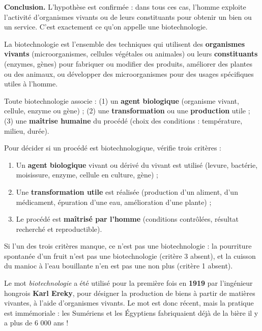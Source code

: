 \documentclass[11pt]{article}
\newcommand{\cle}[1]{{\popxbold\color{popdark}#1}}
\begin{document}
\textbf{Conclusion.} L'hypothèse est confirmée : dans tous ces cas, l'homme exploite l'activité d'organismes vivants ou de leurs constituants pour obtenir un bien ou un service. C'est exactement ce qu'on appelle une biotechnologie.

\begin{definition}[Biotechnologie]
La \cle{biotechnologie} est l'ensemble des techniques qui utilisent des \textbf{organismes vivants} (microorganismes, cellules végétales ou animales) ou leurs \textbf{constituants} (enzymes, gènes) pour fabriquer ou modifier des produits, améliorer des plantes ou des animaux, ou développer des microorganismes pour des usages spécifiques utiles à l'homme.
\end{definition}

\begin{aretenir}
Toute biotechnologie associe : (1) un \textbf{agent biologique} (organisme vivant, cellule, enzyme ou gène) ; (2) une \textbf{transformation} ou une \textbf{production} utile ; (3) une \textbf{maîtrise humaine} du procédé (choix des conditions : température, milieu, durée).
\end{aretenir}

\begin{methode}
Pour décider si un procédé est biotechnologique, vérifie trois critères :
\begin{enumerate}
\item Un \textbf{agent biologique} vivant ou dérivé du vivant est utilisé (levure, bactérie, moisissure, enzyme, cellule en culture, gène) ;
\item Une \textbf{transformation utile} est réalisée (production d'un aliment, d'un médicament, épuration d'une eau, amélioration d'une plante) ;
\item Le procédé est \textbf{maîtrisé par l'homme} (conditions contrôlées, résultat recherché et reproductible).
\end{enumerate}
Si l'un des trois critères manque, ce n'est pas une biotechnologie : la pourriture spontanée d'un fruit n'est pas une biotechnologie (critère 3 absent), et la cuisson du manioc à l'eau bouillante n'en est pas une non plus (critère 1 absent).
\end{methode}

\begin{savaistu}
Le mot \emph{biotechnologie} a été utilisé pour la première fois en \textbf{1919} par l'ingénieur hongrois \textbf{Karl Ereky}, pour désigner la production de biens à partir de matières vivantes, à l'aide d'organismes vivants. Le mot est donc récent, mais la pratique est immémoriale : les Sumériens et les Égyptiens fabriquaient déjà de la bière il y a plus de 6 000 ans !
\end{savaistu}
\end{document}
